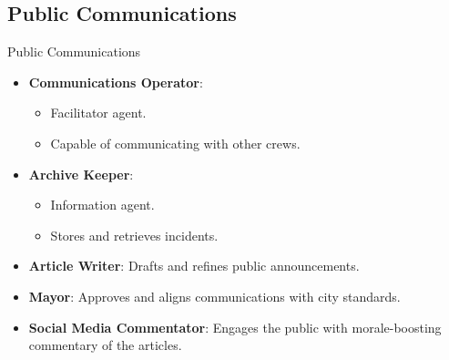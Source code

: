 \subsection{Public Communications}
\begin{frame}{Public Communications}
    \begin{itemize}
        \item \textbf{Communications Operator}:
        \begin{itemize}
            \item \alert{Facilitator} agent.
            \item Capable of \alert{communicating} with other crews.
        \end{itemize}
        \item \textbf{Archive Keeper}:
        \begin{itemize}
            \item \alert{Information} agent.
            \item \alert{Stores} and \alert{retrieves} incidents.
        \end{itemize}
        \item \textbf{Article Writer}: Drafts and refines public announcements.
        \item \textbf{Mayor}: Approves and aligns communications with city standards.
        \item \textbf{Social Media Commentator}: Engages the public with morale-boosting commentary of the articles.
    \end{itemize}
    
\end{frame} 